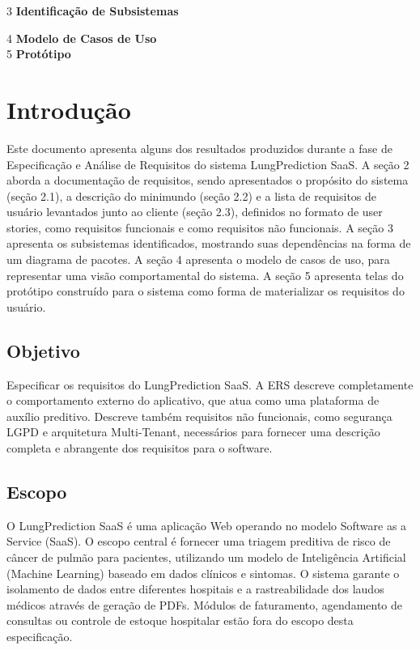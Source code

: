 \documentclass{article}
\begin{document}
\vspace{0.3cm}
3 \textbf{Identificação de Subsistemas}

\vspace{0.3cm}
4 \textbf{Modelo de Casos de Uso} \\
5 \textbf{Protótipo} 

\newpage
\section{Introdução}
Este documento apresenta alguns dos resultados produzidos durante a fase de Especificação e Análise de Requisitos do sistema LungPrediction SaaS. A seção 2 aborda a documentação de requisitos, sendo apresentados o propósito do sistema (seção 2.1), a descrição do minimundo (seção 2.2) e a lista de requisitos de usuário levantados junto ao cliente (seção 2.3), definidos no formato de user stories, como requisitos funcionais e como requisitos não funcionais. A seção 3 apresenta os subsistemas identificados, mostrando suas dependências na forma de um diagrama de pacotes. A seção 4 apresenta o modelo de casos de uso, para representar uma visão comportamental do sistema. A seção 5 apresenta telas do protótipo construído para o sistema como forma de materializar os requisitos do usuário.

\subsection{Objetivo}
Especificar os requisitos do LungPrediction SaaS. A ERS descreve completamente o comportamento externo do aplicativo, que atua como uma plataforma de auxílio preditivo. Descreve também requisitos não funcionais, como segurança LGPD e arquitetura Multi-Tenant, necessários para fornecer uma descrição completa e abrangente dos requisitos para o software.

\subsection{Escopo}
O LungPrediction SaaS é uma aplicação Web operando no modelo Software as a Service (SaaS). O escopo central é fornecer uma triagem preditiva de risco de câncer de pulmão para pacientes, utilizando um modelo de Inteligência Artificial (Machine Learning) baseado em dados clínicos e sintomas. O sistema garante o isolamento de dados entre diferentes hospitais e a rastreabilidade dos laudos médicos através de geração de PDFs. Módulos de faturamento, agendamento de consultas ou controle de estoque hospitalar estão fora do escopo desta especificação.
\end{document}

